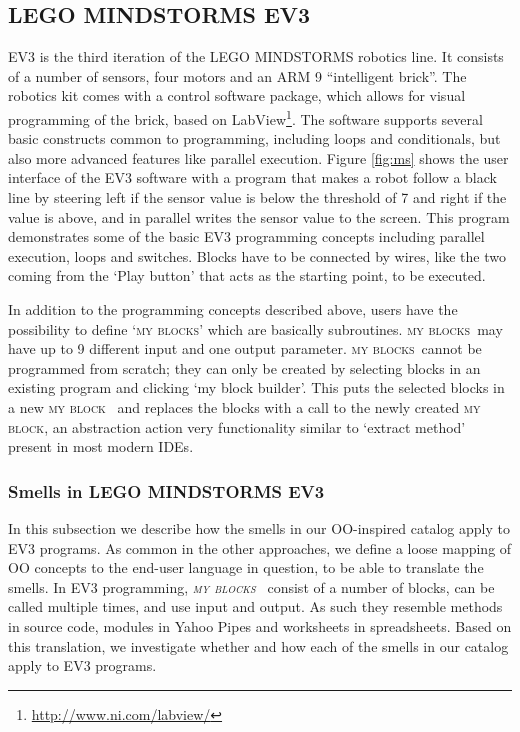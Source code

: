 \documentclass{sig-alternate}
\newcommand{\ms}{LEGO MINDSTORMS EV3}
\newcommand{\mbs}{\textsc{my blocks}}
\newcommand{\mb}{\textsc{my block}}
\begin{document}
\subsection{\ms}
\label{sec:lego}
EV3 is the third iteration of the LEGO MINDSTORMS robotics line. It consists of a number of sensors, four motors and an ARM 9 ``intelligent brick''. The robotics kit comes with a control software package, which allows for visual programming of the brick, based on LabView\footnote{\url{http://www.ni.com/labview/}}. The software supports several basic constructs common to programming, including loops and conditionals, but also more advanced features like parallel execution. Figure \ref{fig:ms} shows the user interface of the EV3 software with a program that makes a robot follow a black line by steering left if the sensor value is below the threshold of 7 and right if the value is above, and in parallel writes the sensor value to the screen. This program demonstrates some of the basic EV3 programming concepts including parallel execution, loops and switches. Blocks have to be connected by wires, like the two coming from the `Play button' that acts as the starting point, to be executed. 

In addition to the programming concepts described above, users have the possibility to define `\mbs' which are basically  subroutines. \mbs~may have up to 9 different input and one output parameter. \mbs~cannot be programmed from scratch; they can only be created by selecting blocks in an existing program and clicking `my block builder'. This puts the selected blocks in a new \mb~ and replaces the blocks with a call to the newly created \mb, an abstraction action very functionality similar to `extract method' present in most modern IDEs. 

\subsubsection{Smells in \ms}
In this subsection we describe how the smells in our OO-inspired catalog apply to EV3 programs. As common in the other approaches, we define a loose mapping of OO concepts to the end-user language in question, to be able to translate the smells. In EV3 programming, \emph{\mbs~} consist of a number of blocks, can be called multiple times, and use input and output. As such they resemble methods in source code, modules in Yahoo Pipes and worksheets in spreadsheets. Based on this translation, we investigate whether and how each of the smells in our catalog  apply to EV3 programs.  
\end{document}
